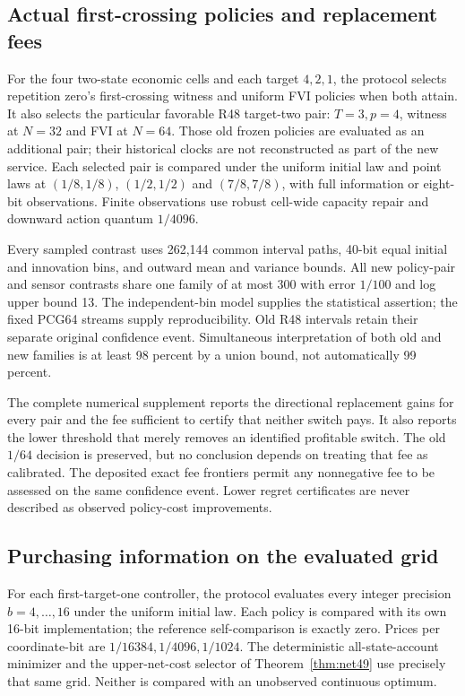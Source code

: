 




\subsection{Actual first-crossing policies and replacement fees}
For the four two-state economic cells and each target $4,2,1$, the protocol selects repetition zero's first-crossing witness and uniform FVI policies when both attain. It also selects the particular favorable R48 target-two pair: $T=3,p=4$, witness at $N=32$ and FVI at $N=64$. Those old frozen policies are evaluated as an additional pair; their historical clocks are not reconstructed as part of the new service. Each selected pair is compared under the uniform initial law and point laws at $(1/8,1/8)$, $(1/2,1/2)$ and $(7/8,7/8)$, with full information or eight-bit observations. Finite observations use robust cell-wide capacity repair and downward action quantum $1/4096$.

Every sampled contrast uses 262,144 common interval paths, 40-bit equal initial and innovation bins, and outward mean and variance bounds. All new policy-pair and sensor contrasts share one family of at most 300 with error $1/100$ and log upper bound 13. The independent-bin model supplies the statistical assertion; the fixed PCG64 streams supply reproducibility. Old R48 intervals retain their separate original confidence event. Simultaneous interpretation of both old and new families is at least 98 percent by a union bound, not automatically 99 percent.


The complete numerical supplement reports the directional replacement gains for every pair and the fee sufficient to certify that neither switch pays. It also reports the lower threshold that merely removes an identified profitable switch. The old $1/64$ decision is preserved, but no conclusion depends on treating that fee as calibrated. The deposited exact fee frontiers permit any nonnegative fee to be assessed on the same confidence event. Lower regret certificates are never described as observed policy-cost improvements.

\subsection{Purchasing information on the evaluated grid}
For each first-target-one controller, the protocol evaluates every integer precision $b=4,\ldots,16$ under the uniform initial law. Each policy is compared with its own 16-bit implementation; the reference self-comparison is exactly zero. Prices per coordinate-bit are $1/16384,1/4096,1/1024$. The deterministic all-state-account minimizer and the upper-net-cost selector of Theorem~\ref{thm:net49} use precisely that same grid. Neither is compared with an unobserved continuous optimum.

